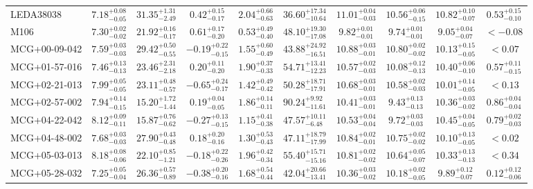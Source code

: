 \documentclass[onecolumn]{mn2e}
\begin{document}
\begin{landscape}
{\begin{center}
\begin{longtable}{lccccccccc}
LEDA38038 & $7.18_{-0.05}^{+0.08}$ & $31.35_{-2.49}^{+1.31}$ & $0.42_{-0.17}^{+0.15}$ & $2.04_{-0.63}^{+0.66}$ &$36.60_{-10.64}^{+17.34}$ & $11.01_{-0.03}^{+0.04}$ & $10.56_{-0.15}^{+0.06}$ & $10.82_{-0.07}^{+0.10}$ & $0.53_{-0.10}^{+0.15}$ \\
M106 & $7.30_{-0.02}^{+0.02}$ & $21.92_{-0.17}^{+0.16}$ & $0.61_{-0.20}^{+0.17}$ & $0.53_{-0.40}^{+0.49}$ &$48.10_{-17.08}^{+19.30}$ & $9.82_{-0.01}^{+0.01}$ & $9.74_{-0.01}^{+0.01}$ & $9.05_{-0.07}^{+0.04}$ & $<-0.08$ \\
MCG+00-09-042 & $7.59_{-0.03}^{+0.03}$ & $29.42_{-0.55}^{+0.50}$ & $-0.19_{-0.15}^{+0.22}$ & $1.55_{-0.49}^{+0.60}$ &$43.88_{-16.51}^{+24.92}$ & $10.88_{-0.01}^{+0.03}$ & $10.80_{-0.02}^{+0.02}$ & $10.13_{-0.05}^{+0.15}$ & $<0.07$ \\
MCG+01-57-016 & $7.46_{-0.13}^{+0.13}$ & $23.46_{-2.18}^{+2.31}$ & $0.20_{-0.20}^{+0.11}$ & $1.90_{-0.33}^{+0.37}$ &$54.71_{-12.23}^{+13.41}$ & $10.57_{-0.03}^{+0.02}$ & $10.08_{-0.13}^{+0.12}$ & $10.40_{-0.10}^{+0.06}$ & $0.57_{-0.15}^{+0.11}$ \\
MCG+02-21-013 & $7.99_{-0.05}^{+0.05}$ & $23.11_{-0.57}^{+0.48}$ & $-0.65_{-0.17}^{+0.24}$ & $1.42_{-0.42}^{+0.49}$ &$50.28_{-17.91}^{+18.71}$ & $10.68_{-0.01}^{+0.03}$ & $10.58_{-0.03}^{+0.02}$ & $10.01_{-0.05}^{+0.14}$ & $<0.13$ \\
MCG+02-57-002 & $7.94_{-0.15}^{+0.14}$ & $15.20_{-1.44}^{+1.72}$ & $0.19_{-0.05}^{+0.04}$ & $1.86_{-0.11}^{+0.14}$ &$90.24_{-11.61}^{+9.92}$ & $10.41_{-0.01}^{+0.03}$ & $9.43_{-0.13}^{+0.13}$ & $10.36_{-0.02}^{+0.03}$ & $0.86_{-0.04}^{+0.04}$ \\
MCG+04-22-042 & $8.12_{-0.11}^{+0.09}$ & $15.87_{-0.62}^{+0.76}$ & $-0.27_{-0.15}^{+0.13}$ & $1.15_{-0.38}^{+0.41}$ &$47.57_{-6.48}^{+10.11}$ & $10.53_{-0.04}^{+0.04}$ & $9.72_{-0.03}^{+0.03}$ & $10.45_{-0.05}^{+0.04}$ & $0.79_{-0.03}^{+0.02}$ \\
MCG+04-48-002 & $7.68_{-0.03}^{+0.03}$ & $27.90_{-0.48}^{+0.43}$ & $0.18_{-0.16}^{+0.20}$ & $1.30_{-0.43}^{+0.53}$ &$47.11_{-17.99}^{+18.79}$ & $10.84_{-0.01}^{+0.02}$ & $10.75_{-0.02}^{+0.02}$ & $10.10_{-0.05}^{+0.13}$ & $<0.02$ \\
MCG+05-03-013 & $8.18_{-0.06}^{+0.08}$ & $22.10_{-1.21}^{+0.85}$ & $-0.18_{-0.26}^{+0.22}$ & $1.96_{-0.34}^{+0.42}$ &$55.40_{-15.16}^{+15.71}$ & $10.81_{-0.02}^{+0.02}$ & $10.64_{-0.07}^{+0.05}$ & $10.33_{-0.13}^{+0.13}$ & $<0.34$ \\
MCG+05-28-032 & $7.25_{-0.04}^{+0.05}$ & $26.36_{-0.89}^{+0.57}$ & $-0.38_{-0.16}^{+0.20}$ & $1.68_{-0.44}^{+0.54}$ &$42.04_{-13.41}^{+20.66}$ & $10.36_{-0.02}^{+0.03}$ & $10.18_{-0.05}^{+0.02}$ & $9.89_{-0.07}^{+0.12}$ & $0.12_{-0.06}^{+0.12}$ \\

\end{longtable}
\end{center}}
\end{landscape}
\end{document}
